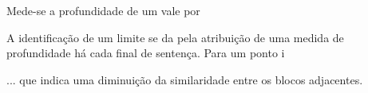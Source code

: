 Mede-se a profundidade de um vale por

A identificação de um limite se da pela atribuição de uma medida de profundidade há cada final de sentença. Para um ponto i 









... que indica uma diminuição da similaridade entre os blocos adjacentes. 



















